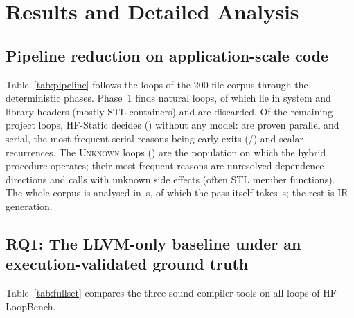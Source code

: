 \section{Results and Detailed Analysis}
\label{sec:results}

\subsection{Pipeline reduction on application-scale code}
\label{sec:rq-field}
Table~\ref{tab:pipeline} follows the loops of the 200-file corpus through the deterministic phases. Phase~1 finds \plRaw{} natural loops, of which \plHeader{} lie in system and library headers (mostly STL containers) and are discarded. Of the remaining \fieldLoops{} project loops, HF-Static decides \plDecided{} (\plDecidedPct{}) without any model: \fieldPar{} are proven parallel and \fieldSer{} serial, the most frequent serial reasons being early exits (/) and scalar recurrences. The \fieldUnk{} \textsc{Unknown} loops (\fieldPctUnk{}) are the population on which the hybrid procedure operates; their most frequent reasons are unresolved dependence directions and calls with unknown side effects (often STL member functions). The whole corpus is analysed in \fieldSeconds{}\,s, of which the pass itself takes \plPassSeconds{}\,s; the rest is IR generation.



\subsection{RQ1: The LLVM-only baseline under an execution-validated ground truth}
\label{sec:rq-static}
Table~\ref{tab:fullset} compares the three sound compiler tools on all \nBenchLoops{} loops of HF-LoopBench.



